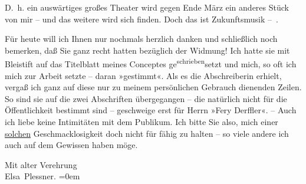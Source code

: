 \pstart
           D. h. ein auswärtiges großes
      Theater wird gegen Ende März
         ein anderes Stück von mir
         \label{K_L03724-2v}\label{K_L03724-2} – und das weitere
      wird sich finden. Doch
      das ist Zukunftsmusik – .\pend
           
\pstart
           Für heute will ich Ihnen
      nur nochmals herzlich danken
      und schließlich noch  bemerken, daß Sie ganz recht hatten
      bezüglich der Widmung! Ich
      hatte sie \introOben{}mit Bleistift\introOben{} auf das Titelblatt
         meines Conceptes ge\substVorne{}\textsuperscript{schrieben}\substDazwischen{}setzt\substHinten{} und
      mich, so oft ich mich zur {\pb}Arbeit setzte – daran »gestimmt«.
      Als es die Abschreiberin erhielt,
      vergaß ich ganz auf diese \introOben{}nur\introOben{} zu
      meinem persönlichen Gebrauch
      dienenden Zeilen. So sind sie
      auf die zwei Abschriften übergegangen – die natürlich nicht
      für die Öffentlichkeit bestimmt
      sind – geschweige erst für Herrn
      »Fery Derffler«. – Auch ich
      liebe keine Intimitäten mit
      dem Publikum. Ich bitte
      Sie also, mich einer \uline{solchen}
      Geschmacklosigkeit doch nicht
      für fähig zu halten – so
      viele andere ich auch auf dem
      Gewissen haben möge.\pend
           
\pstart
           Mit alter Verehrung{\\[\baselineskip]}\spacefill\mbox{Elsa Plessner}.
                  \pend
           \leftskip=0em{}\endnumbering{}
\begin{anhang}
\end{anhang}
      
